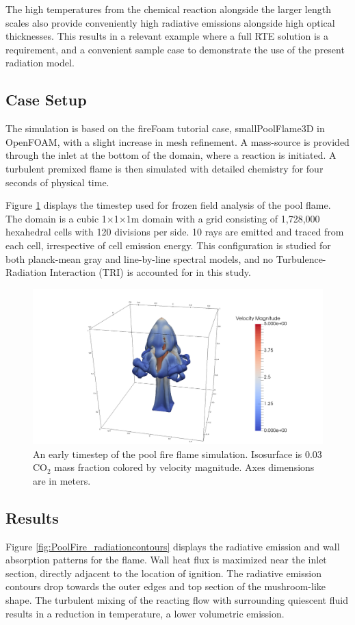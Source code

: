 The high temperatures from the chemical reaction alongside the larger length scales also provide conveniently high radiative emissions alongside high optical thicknesses. 
This results in a relevant example where a full RTE solution is a requirement, and a convenient sample case to demonstrate the use of the present radiation model.

\subsection{Case Setup}
The simulation is based on the fireFoam tutorial case, smallPoolFlame3D in OpenFOAM, with a slight increase in mesh refinement. 
A mass-source is provided through the inlet at the bottom of the domain, where a reaction is initiated. A turbulent premixed flame is then simulated with detailed chemistry for four seconds of physical time.

Figure \ref{fig:PoolFire_diagram} displays the timestep used for frozen field analysis of the pool flame. The domain is a cubic 1$\times$1$\times$1m domain with a grid consisting of 1,728,000 hexahedral cells with 120 divisions per side.
10 rays are emitted and traced from each cell, irrespective of cell emission energy.
This configuration is studied for both planck-mean gray and line-by-line spectral models, and no Turbulence-Radiation Interaction (TRI) is accounted for in this study.

\begin{figure}
\includegraphics[width=\linewidth]{figures/ch4/contour_early.png}
\caption{An early timestep of the pool fire flame simulation. Isosurface is 0.03 CO$_2$ mass fraction colored by velocity magnitude. Axes dimensions are in meters.}
\label{fig:PoolFire_diagram}
\end{figure}

\subsection{Results}
Figure \ref{fig:PoolFire_radiationcontours} displays the radiative emission and wall absorption patterns for the flame. Wall heat flux is maximized near the inlet section, directly adjacent to the location of ignition. 
The radiative emission contours drop towards the outer edges and top section of the mushroom-like shape. The turbulent mixing of the reacting flow with surrounding quiescent fluid results in a reduction in temperature, a lower volumetric emission.  

